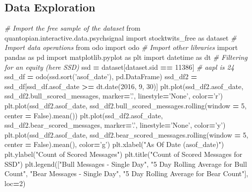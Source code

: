 \documentclass[11,]{article}
\newenvironment{Shaded}{\begin{snugshade}}{\end{snugshade}}
\newcommand{\CommentTok}[1]{\textcolor[rgb]{0.56,0.35,0.01}{\textit{#1}}}
\newcommand{\DecValTok}[1]{\textcolor[rgb]{0.00,0.00,0.81}{#1}}
\newcommand{\ImportTok}[1]{#1}
\newcommand{\NormalTok}[1]{#1}
\newcommand{\OperatorTok}[1]{\textcolor[rgb]{0.81,0.36,0.00}{\textbf{#1}}}
\newcommand{\StringTok}[1]{\textcolor[rgb]{0.31,0.60,0.02}{#1}}
\newcommand{\VariableTok}[1]{\textcolor[rgb]{0.00,0.00,0.00}{#1}}
\begin{document}
\hypertarget{data-exploration}{%
\subsection{Data Exploration}\label{data-exploration}}

\begin{Shaded}
\begin{Highlighting}[]
\CommentTok{# Import the free sample of the dataset}
\ImportTok{from}\NormalTok{ quantopian.interactive.data.psychsignal }\ImportTok{import}\NormalTok{ stocktwits_free  }\ImportTok{as}\NormalTok{ dataset}
\CommentTok{# Import data operations}
\ImportTok{from}\NormalTok{ odo }\ImportTok{import}\NormalTok{ odo}
\CommentTok{# Import other libraries}
\ImportTok{import}\NormalTok{ pandas }\ImportTok{as}\NormalTok{ pd}
\ImportTok{import}\NormalTok{ matplotlib.pyplot }\ImportTok{as}\NormalTok{ plt}
\ImportTok{import}\NormalTok{ datetime }\ImportTok{as}\NormalTok{ dt}
\CommentTok{# Filtering for an equity (here SSD)}
\NormalTok{ssd }\OperatorTok{=}\NormalTok{ dataset[dataset.sid }\OperatorTok{==} \DecValTok{11386}\NormalTok{] }\CommentTok{# aapl is 24}
\NormalTok{ssd_df }\OperatorTok{=}\NormalTok{ odo(ssd.sort(}\StringTok{'asof_date'}\NormalTok{), pd.DataFrame)}
\NormalTok{ssd_df2 }\OperatorTok{=}\NormalTok{ ssd_df[ssd_df.asof_date }\OperatorTok{>=}\NormalTok{ dt.date(}\DecValTok{2016}\NormalTok{, }\DecValTok{9}\NormalTok{, }\DecValTok{30}\NormalTok{)]}
\NormalTok{plt.plot(ssd_df2.asof_date, ssd_df2.bull_scored_messages, marker}\OperatorTok{=}\StringTok{'.'}\NormalTok{, linestyle}\OperatorTok{=}\StringTok{'None'}\NormalTok{, color}\OperatorTok{=}\StringTok{'r'}\NormalTok{)}
\NormalTok{plt.plot(ssd_df2.asof_date, ssd_df2.bull_scored_messages.rolling(window }\OperatorTok{=} \DecValTok{5}\NormalTok{, center }\OperatorTok{=} \VariableTok{False}\NormalTok{).mean())}
\NormalTok{plt.plot(ssd_df2.asof_date, ssd_df2.bear_scored_messages, marker}\OperatorTok{=}\StringTok{'.'}\NormalTok{, linestyle}\OperatorTok{=}\StringTok{'None'}\NormalTok{, color}\OperatorTok{=}\StringTok{'y'}\NormalTok{)}
\NormalTok{plt.plot(ssd_df2.asof_date, ssd_df2.bear_scored_messages.rolling(window }\OperatorTok{=} \DecValTok{5}\NormalTok{, center }\OperatorTok{=} \VariableTok{False}\NormalTok{).mean(), color}\OperatorTok{=}\StringTok{'g'}\NormalTok{)}
\NormalTok{plt.xlabel(}\StringTok{"As Of Date (asof_date)"}\NormalTok{)}
\NormalTok{plt.ylabel(}\StringTok{"Count of Scored Messages"}\NormalTok{)}
\NormalTok{plt.title(}\StringTok{"Count of Scored Messages for SSD"}\NormalTok{)}
\NormalTok{plt.legend([}\StringTok{"Bull Messages - Single Day"}\NormalTok{, }\StringTok{"5 Day Rolling Average for Bull Count"}\NormalTok{, }\StringTok{"Bear Messages - Single Day"}\NormalTok{, }\StringTok{"5 Day Rolling Average for Bear Count"}\NormalTok{], loc}\OperatorTok{=}\DecValTok{2}\NormalTok{)}

\end{Highlighting}
\end{Shaded}
\end{document}
